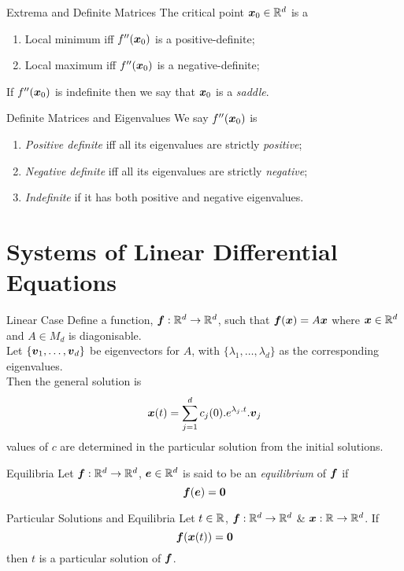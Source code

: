 \documentclass[11pt,a4paper]{article}
\begin{document}
\subtitle{Theorem 15.10 - }{Extrema and Definite Matrices}
The critical point $\boldsymbol{x}_0 \in \mathbb{R}^d$ is a
\begin{enumerate}[label=\roman*)]
  \item Local minimum iff $f''(\boldsymbol{x}_0)$ is a positive-definite;
  \item Local maximum iff $f''(\boldsymbol{x}_0)$ is a negative-definite;
\end{enumerate}
If $f''(\boldsymbol{x}_0)$ is indefinite then we say that $\boldsymbol{x}_0$ is a \textit{saddle}.\\

\subtitle{Theorem 15.11 - }{Definite Matrices and Eigenvalues}
We say $f''(\boldsymbol{x}_0)$ is
\begin{enumerate}[label=\roman*)]
  \item \textit{Positive definite} iff all its eigenvalues are strictly \textit{positive};
  \item \textit{Negative definite} iff all its eigenvalues are strictly \textit{negative};
  \item \textit{Indefinite} if it has both positive and negative eigenvalues.
\end{enumerate}

\section{Systems of Linear Differential Equations}

\subtitle{Theorem 16.01 - }{Linear Case}
Define a function, $\boldsymbol{f} : \mathbb{R}^d \to \mathbb{R}^d$, such that $\boldsymbol{f}(\boldsymbol{x}) = A\boldsymbol{x}$ where $\boldsymbol{x} \in \mathbb{R}^d$ and $A \in M_d$ is diagonisable.\\
Let $\{\boldsymbol{v}_1 , \dots , \boldsymbol{v}_d \}$ be eigenvectors for $A$, with $\{ \lambda_1 , \dots , \lambda_d \}$ as the corresponding eigenvalues.\\
Then the general solution is $$\boldsymbol{x}(t) = \sum_{j=1}^d c_j(0) . e^{\lambda_j.t}.\boldsymbol{v}_j$$ values of $c$ are determined in the particular solution from the initial solutions.\\

\subtitle{Definition 16.02 - }{Equilibria}
Let $\boldsymbol{f} : \mathbb{R}^d \to \mathbb{R}^d$, $\boldsymbol{e} \in \mathbb{R}^d$ is said to be an \textit{equilibrium} of $\boldsymbol{f}$ if
$$\boldsymbol{f}(\boldsymbol{e}) = \boldsymbol{0}$$

\subtitle{Theorem 16.03 - }{Particular Solutions and Equilibria}
Let $t \in \mathbb{R}$, $\boldsymbol{f} : \mathbb{R}^d \to \mathbb{R}^d$ \& $\boldsymbol{x} : \mathbb{R} \to \mathbb{R}^d$. If
$$\boldsymbol{f}(\boldsymbol{x}(t)) = \boldsymbol{0} $$
then $t$ is a particular solution of $\boldsymbol{f}$.
\end{document}
